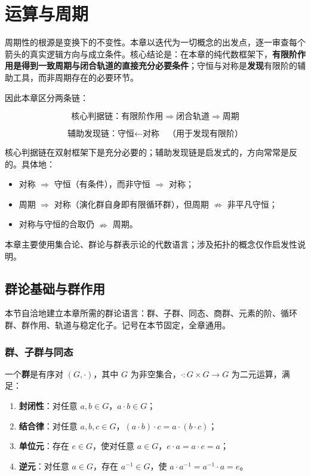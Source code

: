 \chapter{运算与周期}
\label{chap:period_foundation}


\begin{remark}[本章定位与两条逻辑链]\label{rem:chapter_positioning}
周期性的根源是变换下的不变性。本章以迭代为一切概念的出发点，逐一审查每个箭头的真实逻辑方向与成立条件。核心结论是：在本章的纯代数框架下，\textbf{有限阶作用是得到一致周期与闭合轨道的直接充分必要条件}；守恒与对称是\textbf{发现}有限阶的辅助工具，而非周期存在的必要环节。

因此本章区分两条链：

\[
\boxed{\text{核心判据链：有限阶作用}\Longrightarrow\text{闭合轨道}\Longrightarrow\text{周期}}
\]

\[
\boxed{\text{辅助发现链：守恒}\longleftarrow\text{对称}\quad\text{（用于发现有限阶）}}
\]

核心判据链在双射框架下是充分必要的；辅助发现链是启发式的，方向常常是反的。具体地：
\begin{itemize}
    \item 对称 $\Rightarrow$ 守恒（有条件），而非守恒 $\Rightarrow$ 对称；
    \item 周期 $\Rightarrow$ 对称（演化群自身即有限循环群），但周期 $\nRightarrow$ 非平凡守恒；
    \item 对称与守恒的合取仍 $\nRightarrow$ 周期。
\end{itemize}

本章主要使用集合论、群论与群表示论的代数语言；涉及拓扑的概念仅作启发性说明。
\end{remark}

\section{群论基础与群作用}
\label{sec:group_theory}

本节自洽地建立本章所需的群论语言：群、子群、同态、商群、元素的阶、循环群、群作用、轨道与稳定化子。记号在本节固定，全章通用。

\subsection{群、子群与同态}

\begin{definition}[群]\label{def:group}
一个\textbf{群}是有序对 $(G,\cdot)$，其中 $G$ 为非空集合，$\cdot:G\times G\to G$ 为二元运算，满足：
\begin{enumerate}[label=(\arabic*)]
    \item \textbf{封闭性}：对任意 $a,b\in G$，$a\cdot b\in G$；
    \item \textbf{结合律}：对任意 $a,b,c\in G$，$(a\cdot b)\cdot c=a\cdot(b\cdot c)$；
    \item \textbf{单位元}：存在 $e\in G$，使对任意 $a\in G$，$e\cdot a=a\cdot e=a$；
    \item \textbf{逆元}：对任意 $a\in G$，存在 $a^{-1}\in G$，使 $a\cdot a^{-1}=a^{-1}\cdot a=e$。
\end{enumerate}
\end{definition}

